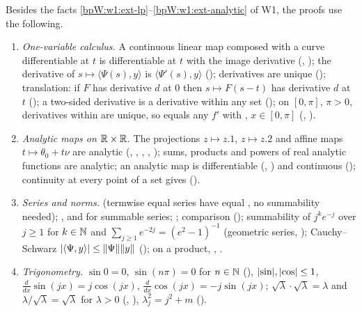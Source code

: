 Besides the facts \ref{bpW:w1:ext-lp}--\ref{bpW:w1:ext-analytic} of W1, the proofs use the following.
{\raggedright
\begin{enumerate}[label=(W2-E\arabic*),ref=(W2-E\arabic*)]
\item\label{bpW:w2:ext-deriv} \emph{One-variable calculus.} A continuous linear map composed with a curve
  differentiable at $t$ is differentiable at $t$ with the image derivative
  (, ); the derivative of
  $s\mapsto\langle\Psi(s),y\rangle$ is $\langle\Psi'(s),y\rangle$ (); derivatives are unique
  (); translation: if $F$ has derivative $d$ at $0$ then $s\mapsto F(s-t)$ has derivative $d$
  at $t$ (); a two-sided derivative is a derivative within any set
  (); on $[0,\pi]$, $\pi>0$, derivatives within are unique, so
   equals any $f'$ with ,
  $x\in[0,\pi]$ (, ).
\item\label{bpW:w2:ext-an} \emph{Analytic maps on $\mathbb{R}\times\mathbb{R}$.} The projections $z\mapsto z.1$, $z\mapsto z.2$ and
  affine maps $t\mapsto\theta_0+t\nu$ are analytic (, ,
  , , ); sums, products and powers of real
  analytic functions are analytic; an analytic map is differentiable (,
  ) and continuous (); continuity at every point of a
  set gives  ().
\item\label{bpW:w2:ext-sums} \emph{Series and norms.}  (termwise equal series have equal
  , no summability needed); ,  and 
  for summable series; ; comparison (); summability of
  $j^k e^{-j}$ over $j\ge1$ for $k\in\mathbb{N}$ and $\sum_{j\ge1}e^{-2j}=(e^2-1)^{-1}$ (geometric series,
  ); Cauchy--Schwarz $\lvert \langle\Psi,y\rangle\rvert\le\lVert \Psi\rVert\lVert y\rVert$
  (); on a product, , .
\item\label{bpW:w2:ext-trig} \emph{Trigonometry.} $\sin0=0$, $\sin(n\pi)=0$ for $n\in\mathbb{N}$ (),
  $\lvert \sin\rvert,\lvert \cos\rvert\le1$, $\frac{d}{dx}\sin(jx)=j\cos(jx)$, $\frac{d}{dx}\cos(jx)=-j\sin(jx)$;
  $\sqrt\lambda\cdot\sqrt\lambda=\lambda$ and $\lambda/\sqrt\lambda=\sqrt\lambda$ for $\lambda>0$
  (, ), $\lambda_j^2=j^2+m$ ().
\end{enumerate}
\par}

